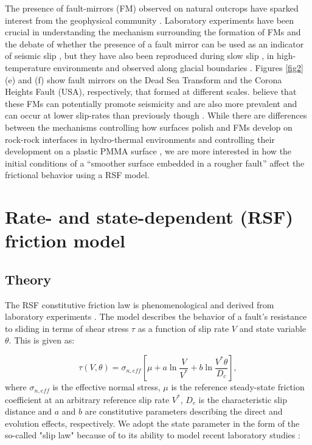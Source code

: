 \documentclass[preprint,1p, 10pt,authoryear]{elsarticle}
\begin{document}
The presence of fault-mirrors (FM) observed on natural outcrops have sparked interest from the geophysical community \citep{Fondriest2013,Kirkpatrick2013, Siman-Tov2013}.  Laboratory experiments have been crucial in understanding the mechanism surrounding the formation of FMs and the debate of whether the presence of a fault mirror can be used as an indicator of seismic slip \citep{Fondriest2013,Siman-Tov2013,Pozzi2018}, but they have also been reproduced during slow slip \citep{Tisato2012,Siman-Tov2015}, in high-temperature environments \citep{Pluymakers2017} and observed along glacial boundaries \citep{Siman-Tov2017}. Figures \ref{fig2}(e) and (f) show fault mirrors on the Dead Sea Transform and the Corona Heights Fault (USA), respectively, that formed at different scales.  \citet{Goldberg2016} believe that these FMs can potentially promote seismicity and are also more prevalent and can occur at lower slip-rates than previously though \citep{Verberne2019}.  While there are differences between the mechanisms controlling how surfaces polish and FMs develop on rock-rock interfaces in hydro-thermal environments and controlling their development on a plastic PMMA surface \citep{Bouissou1998}, we are  more interested in how the initial conditions of a ``smoother surface embedded in a rougher fault'' affect the frictional behavior using a RSF model. 

\section{Rate- and state-dependent (RSF) friction model}
\subsection{Theory}
\label{Theory}
The RSF constitutive friction law is phenomenological and derived from laboratory experiments \citep{Dieterich1979, Ruina1983}.  The model describes the behavior of a fault's resistance to sliding in terms of shear stress $\tau$ as a function of slip rate $V$ and state variable $\theta$. This is given as:

\begin{equation}
\label{eq5}
\tau \left( V,\theta \right) = \sigma_{n,eff} \left[\mu + a \ln\frac{V}{V^{*}} + b \ln\frac{V^{*}\theta}{D_{c}}\right],
\end{equation}   
\noindent where $\sigma_{n,eff}$ is the effective normal stress, $\mu$ is the reference steady-state friction coefficient at an arbitrary reference slip rate $V^{*}$, $D_{c}$ is the characteristic slip distance and $a$ and $b$ are constitutive parameters describing the direct and evolution effects, respectively.  We adopt the state parameter in the form of the so-called "slip law" because of to its ability to model recent laboratory studies \citep{Bhattacharya2015, Kaneko2011, Kaneko2016}:
\end{document}
